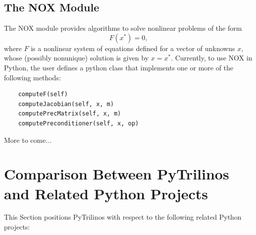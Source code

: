 \documentclass[acmtocl]{acmtrans2m}
\begin{document}
\subsection{The NOX Module}
\label{subsec:nox}

The NOX module provides algorithms to solve nonlinear problems of the
form
\begin{equation}
  F(x^*) = 0,
\end{equation}
where $F$ is a nonlinear system of equations defined for a vector of
unknowns $x$, whose (possibly nonunique) solution is given by
$x=x^*$.  Currently, to use NOX in Python, the user defines a python
class that implements one or more of the following methods:
\begin{verbatim}
    computeF(self)
    computeJacobian(self, x, m)
    computePrecMatrix(self, x, m)
    computePreconditioner(self, x, op)
\end{verbatim}
More to come...

\section{Comparison Between PyTrilinos and Related Python Projects}
\label{sec:comparison_python}

This Section positions PyTrilinos with respect to the following related
Python projects:
\end{document}
